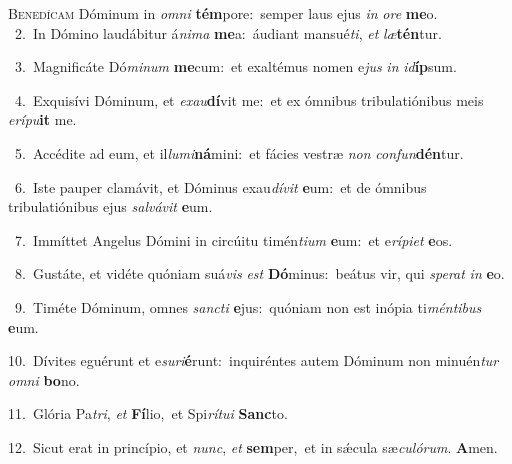 \lettrine{\initial\textcolor{\initialcolor}{B}}{enedícam} Dóminum in \textit{om}\-\textit{ni} \textbf{tém}\-pore:~\star semper laus ejus \textit{in} \textit{o}\-\textit{re} \textbf{me}\-o.\\
{\numbfont\textcolor{\numbcolor}{~2.}}~In Dómino laudábitur á\-\textit{ni}\-\textit{ma} \textbf{me}\-a:~\star áudiant mansué\-\textit{ti}\-, \textit{et} \textit{læ}\-\textbf{tén}tur.\par
{\numbfont\textcolor{\numbcolor}{~3.}}~Magnificáte Dó\-\textit{mi}\-\textit{num} \textbf{me}\-cum:~\star et exaltémus nomen e\textit{jus} \textit{in} \textit{id}\-\textbf{íp}sum.\par
{\numbfont\textcolor{\numbcolor}{~4.}}~Exquisívi Dóminum, et \textit{ex}\-\textit{au}\textbf{dí}vit me:~\star et ex ómnibus tribulatiónibus meis \textit{e}\-\textit{rí}\textit{pu}\textbf{it} me.\par
{\numbfont\textcolor{\numbcolor}{~5.}}~Accédite ad eum, et il\-\textit{lu}\-\textit{mi}\textbf{ná}mini:~\star et fácies vestræ \textit{non} \textit{con}\-\textit{fun}\textbf{dén}tur.\par
{\numbfont\textcolor{\numbcolor}{~6.}}~Iste pauper clamávit, et Dóminus exau\-\textit{dí}\-\textit{vit} \textbf{e}\-um:~\star et de ómnibus tribulatiónibus ejus \textit{sal}\-\textit{vá}\textit{vit} \textbf{e}\-um.\par
{\numbfont\textcolor{\numbcolor}{~7.}}~Immíttet Angelus Dómini in circúitu timén\-\textit{ti}\-\textit{um} \textbf{e}\-um:~\star et e\-\textit{rí}\-\textit{pi}\textit{et} \textbf{e}\-os.\par
{\numbfont\textcolor{\numbcolor}{~8.}}~Gustáte, et vidéte quóniam suá\textit{vis} \textit{est} \textbf{Dó}\-minus:~\star beátus vir, qui \textit{spe}\-\textit{rat} \textit{in} \textbf{e}\-o.\par
{\numbfont\textcolor{\numbcolor}{~9.}}~Timéte Dóminum, omnes \textit{sanc}\-\textit{ti} \textbf{e}\-jus:~\star quóniam non est inópia ti\-\textit{mén}\-\textit{ti}\textit{bus} \textbf{e}\-um.\par
{\numbfont\textcolor{\numbcolor}{10.}}~Dívites eguérunt et e\-\textit{su}\-\textit{ri}\textbf{é}runt:~\star inquiréntes autem Dóminum non minuén\textit{tur} \textit{om}\-\textit{ni} \textbf{bo}\-no.\par
{\numbfont\textcolor{\numbcolor}{11.}}~Glória Pa\-\textit{tri}\-, \textit{et} \textbf{Fí}\-lio,~\star et Spi\-\textit{rí}\-\textit{tu}\textit{i} \textbf{Sanc}\-to.\par
{\numbfont\textcolor{\numbcolor}{12.}}~Sicut erat in princípio, et \textit{nunc}\-, \textit{et} \textbf{sem}\-per,~\star et in sǽcula sæ\-\textit{cu}\-\textit{ló}\textit{rum}. \textbf{A}\-men.\par
